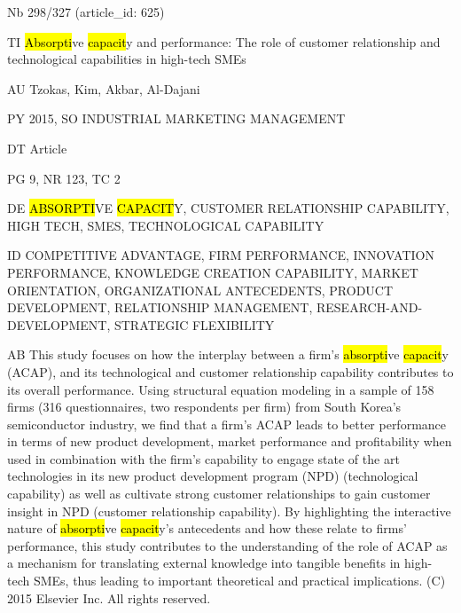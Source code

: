 \documentclass[a4paper]{article}
\begin{document}
\vspace*{-2cm}
Nb \tabto{0cm}298/327 (article\_id: 625)\par
TI \tabto{0cm}\hl{Absorpti}ve \hl{capacit}y and performance: The role of customer relationship and technological capabilities in high-tech SMEs\par
AU \tabto{0cm}Tzokas, Kim, Akbar, Al-Dajani\par
PY \tabto{0cm}2015, SO INDUSTRIAL MARKETING MANAGEMENT\par
DT \tabto{0cm}Article\par
PG \tabto{0cm}9, NR 123, TC 2\par
DE \tabto{0cm}\hl{ABSORPTI}VE \hl{CAPACIT}Y, CUSTOMER RELATIONSHIP CAPABILITY, HIGH TECH, SMES, TECHNOLOGICAL CAPABILITY\par
ID \tabto{0cm}COMPETITIVE ADVANTAGE, FIRM PERFORMANCE, INNOVATION PERFORMANCE, KNOWLEDGE CREATION CAPABILITY, MARKET ORIENTATION, ORGANIZATIONAL ANTECEDENTS, PRODUCT DEVELOPMENT, RELATIONSHIP MANAGEMENT, RESEARCH-AND-DEVELOPMENT, STRATEGIC FLEXIBILITY\par
AB \tabto{0cm}This study focuses on how the interplay between a firm's \hl{absorpti}ve \hl{capacit}y (ACAP), and its technological and customer relationship capability contributes to its overall performance. Using structural equation modeling in a sample of 158 firms (316 questionnaires, two respondents per firm) from South Korea's semiconductor industry, we find that a firm's ACAP leads to better performance in terms of new product development, market performance and profitability when used in combination with the firm's capability to engage state of the art technologies in its new product development program (NPD) (technological capability) as well as cultivate strong customer relationships to gain customer insight in NPD (customer relationship capability). By highlighting the interactive nature of \hl{absorpti}ve \hl{capacit}y's antecedents and how these relate to firms' performance, this study contributes to the understanding of the role of ACAP as a mechanism for translating external knowledge into tangible benefits in high-tech SMEs, thus leading to important theoretical and practical implications. (C) 2015 Elsevier Inc. All rights reserved.\par
\clearpage
\end{document}
